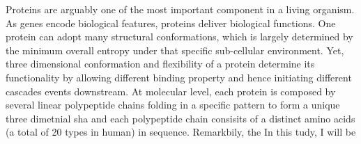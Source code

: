Proteins are arguably one of the most important component in a living organism. As genes encode biological features, proteins deliver biological functions. One protein can adopt many structural conformations, which is largely determined by the minimum overall entropy under that specific sub-cellular environment. Yet, three dimensional conformation and flexibility of a protein determine its functionality by allowing different binding property and hence initiating different cascades events downstream. At molecular level, each protein is composed by several linear polypeptide chains folding in a specific pattern to form a unique three dimetnial sha and each polypeptide chain consisits of a distinct amino acids (a total of 20 types in human) in sequence. Remarkbily, the  In this tudy, I will be 